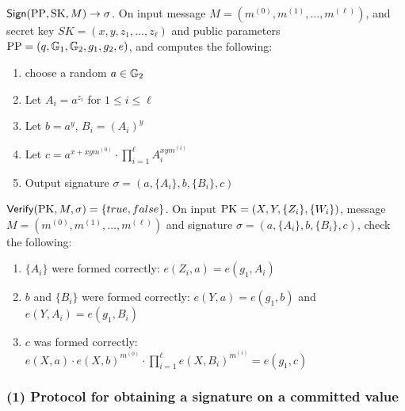 \documentclass[11pt]{report}
\begin{document}
\medskip \noindent
${\sf Sign}(\mathrm{PP}, \mathrm{SK}, M) \rightarrow \sigma$. On input message $M = (m^{(0)}, m^{(1)}, \dots, m^{(\ell)})$, and secret key $SK = (x, y, z_1, \dots, z_\ell)$ and public parameters $\mathrm{PP} = (q, \mathbb{G}_1, \mathbb{G}_2, g_1, g_2, e)$, and computes the following:
\begin{enumerate}
\item choose a random $a \in \mathbb{G}_2$ 
\item Let $A_i = a^{z_i}$ for $1 \le i \le \ell$
\item Let $b = a^y$, $B_i = (A_i)^{y}$
\item Let $c = a^{x + xym^{(0)}} \cdot \prod_{i=1}^{\ell} A_i ^ {xym^{(i)}}$
\item Output signature $\sigma = (a, \{A_i\}, b, \{B_i\}, c)$
\end{enumerate}

\medskip \noindent
${\sf Verify}(\mathrm{PK}, M, \sigma) =  \{true, false\}$. On input $\mathrm{PK} = (X, Y, \{Z_i\}, \{W_i\})$, message $M = (m^{(0)}, m^{(1)}, \dots, m^{(\ell)})$ and signature $\sigma = (a, \{A_i\}, b, \{B_i\}, c)$, check the following:
\begin{enumerate}
\item $\{A_i\}$ were formed correctly: $e(Z_i, a) = e(g_1, A_i)$
\item $b$ and $\{B_i\}$ were formed correctly: $e(Y, a) = e(g_1, b)$ and $e(Y, A_i) = e(g_1, B_i)$
\item $c$ was formed correctly: $e(X, a) \cdot e(X, b)^{m^{(0)}} \cdot \prod_{i=1}^{\ell} e(X, B_i)^{m^{(i)}} = e(g_1, c)$

\end{enumerate}

\subsubsection{(1) Protocol for obtaining a signature on a committed value}
\label{sec:sigoncommit}
\end{document}
